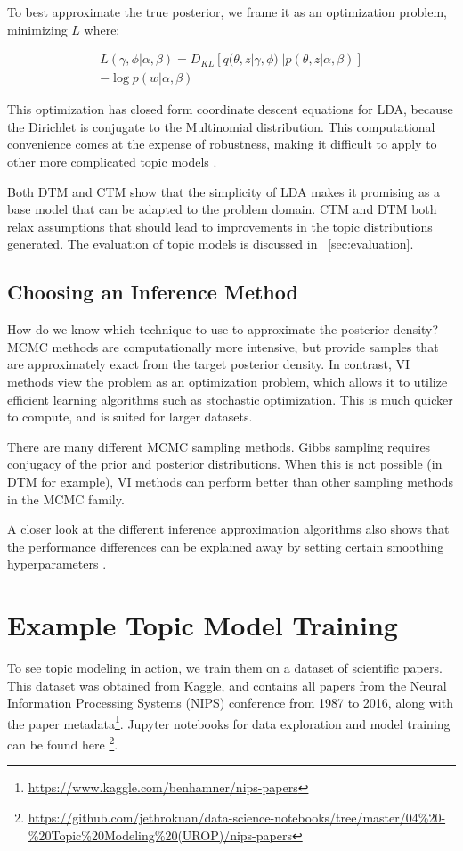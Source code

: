 \documentclass[letterpaper]{article}
\begin{document}
To best approximate the true posterior, we frame it as an optimization
problem, minimizing $L$ where:

\begin{multline}
L(\gamma, \phi | \alpha, \beta) = D_{KL}\left[ q(\theta, z | \gamma,
  \phi) || p(\theta, z | \alpha, \beta) \right] \\
- \log p(w | \alpha, \beta)
\end{multline}

This optimization has closed form coordinate descent equations for
LDA, because the Dirichlet is conjugate to the Multinomial
distribution. This computational convenience comes at the expense of
robustness, making it difficult to apply to other more complicated
topic models \cite{blei2003latent}.

Both DTM and CTM show that the simplicity of LDA makes it promising as
a base model that can be adapted to the problem domain. CTM and DTM both
relax assumptions that should lead to improvements in the topic
distributions generated. The evaluation of topic models is discussed
in ~\autoref{sec:evaluation}.

\subsection{Choosing an Inference Method}
\label{sub:choosing-inference}
How do we know which technique to use to approximate the posterior
density? MCMC methods are computationally more intensive, but provide
samples that are approximately exact from the target posterior
density. In contrast, VI methods view the problem as an optimization
problem, which allows it to utilize efficient learning algorithms such
as stochastic optimization. This is much quicker to compute, and is
suited for larger datasets.

There are many different MCMC sampling methods. Gibbs sampling
requires conjugacy of the prior and posterior distributions. When this
is not possible (in DTM for example), VI methods can perform better
than other sampling methods in the MCMC family.

A closer look at the different inference approximation algorithms
also shows that the performance differences can be explained away by
setting certain smoothing hyperparameters
\cite{asuncion-2012-smoot-infer}.

\section{Example Topic Model Training}
To see topic modeling in action, we train them on a dataset of
scientific papers. This dataset was obtained from Kaggle, and contains
all papers from the Neural Information Processing Systems (NIPS)
conference from 1987 to 2016, along with the paper
metadata\footnote{\url{https://www.kaggle.com/benhamner/nips-papers}}.
Jupyter notebooks for data exploration and model training can be found
here
\footnote{\url{https://github.com/jethrokuan/data-science-notebooks/tree/master/04\%20-\%20Topic\%20Modeling\%20(UROP)/nips-papers}}.
\end{document}

